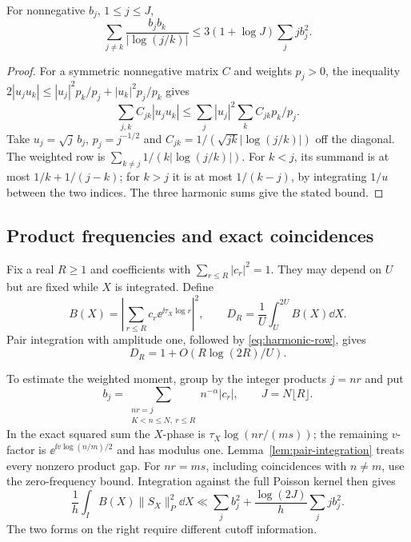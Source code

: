 \begin{lemma}\label{lem:harmonic-row}
For nonnegative $b_j$, $1\le j\le J$,
\begin{equation}\label{eq:harmonic-row}
 \sum_{j\ne k}\frac{b_jb_k}{|\log(j/k)|}
 \le3(1+\log J)\sum_j j b_j^2.
\end{equation}
\end{lemma}
\begin{proof}
For a symmetric nonnegative matrix $C$ and weights $p_j>0$,
the inequality $2|u_ju_k|\le|u_j|^2p_k/p_j+|u_k|^2p_j/p_k$ gives
\[
 \sum_{j,k}C_{jk}|u_j u_k|
 \le\sum_j|u_j|^2\sum_kC_{jk}p_k/p_j.
\]
Take $u_j=\sqrt j\,b_j$, $p_j=j^{-1/2}$ and
$C_{jk}=1/(\sqrt{jk}|\log(j/k)|)$ off the diagonal.
The weighted row is $\sum_{k\ne j}1/(k|\log(j/k)|)$.
For $k<j$, its summand is at most $1/k+1/(j-k)$;
for $k>j$ it is at most $1/(k-j)$, by integrating $1/u$ between
the two indices. The three harmonic sums give the stated bound.
\end{proof}

\subsection{Product frequencies and exact coincidences}

Fix a real $R\ge1$ and coefficients with $\sum_{r\le R}|c_r|^2=1$.
They may depend on $U$ but are fixed while $X$ is integrated. Define
\[
 B(X)=\left|\sum_{r\le R}c_r\ee^{\ii\tau_X\log r}\right|^2,
 \qquad D_R=\frac1U\int_U^{2U}B(X)\dd X.
\]
Pair integration with amplitude one, followed by
\eqref{eq:harmonic-row}, gives
\begin{equation}\label{eq:resonator-denominator}
 D_R=1+O(R\log(2R)/U).
\end{equation}

To estimate the weighted moment, group by the integer products
$j=nr$ and put
\[
 b_j=\sum_{\substack{nr=j\\K<n\le N,\ r\le R}}n^{-\alpha}|c_r|,
 \qquad J=N\lfloor R\rfloor.
\]
In the exact squared sum the $X$-phase is
$\tau_X\log(nr/(ms))$; the remaining $v$-factor is
$\ee^{\ii v\log(n/m)/2}$ and has modulus one.
Lemma~\ref{lem:pair-integration} treats every nonzero product gap.
For $nr=ms$, including coincidences with $n\ne m$, use the
zero-frequency bound. Integration against the full Poisson kernel
then gives
\begin{equation}\label{eq:product-master}
 \frac1h\int_I B(X)\|S_X\|_P^2\dd X
 \ll\sum_jb_j^2+\frac{\log(2J)}h\sum_jj b_j^2.
\end{equation}
The two forms on the right require different cutoff information.

